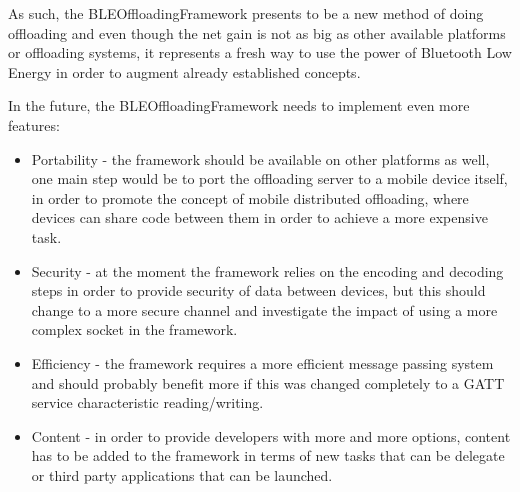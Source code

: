 As such, the BLEOffloadingFramework presents to be a new method of doing offloading and even though the net gain is not as big as other available platforms or offloading systems, it represents a fresh way to use the power of Bluetooth Low Energy in order to augment already established concepts.

In the future, the BLEOffloadingFramework needs to implement even more features:

\begin{itemize}

\item{Portability - the framework should be available on other platforms as well, one main step would be to port the offloading server to a mobile device itself, in order to promote the concept of mobile distributed offloading, where devices can share code between them in order to achieve a more expensive task.}

\item{Security -  at the moment the framework relies on the encoding and decoding steps in order to provide security of data between devices, but this should change to a more secure channel and investigate the impact of using a more complex socket in the framework.}

\item{Efficiency - the framework requires a more efficient message passing system and should probably benefit more if this was changed completely to a GATT service characteristic reading/writing.}

\item{Content -  in order to provide developers with more and more options, content has to be added to the framework in terms of new tasks that can be delegate or third party applications that can be launched.}

\end{itemize}
